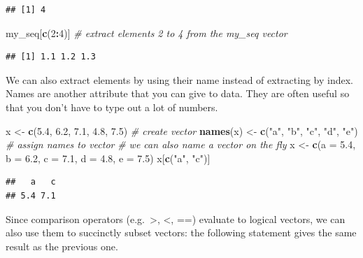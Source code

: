\documentclass[
]{book}
\newenvironment{Shaded}{\begin{snugshade}}{\end{snugshade}}
\newcommand{\AttributeTok}[1]{\textcolor[rgb]{0.13,0.29,0.53}{#1}}
\newcommand{\CommentTok}[1]{\textcolor[rgb]{0.56,0.35,0.01}{\textit{#1}}}
\newcommand{\DecValTok}[1]{\textcolor[rgb]{0.00,0.00,0.81}{#1}}
\newcommand{\FloatTok}[1]{\textcolor[rgb]{0.00,0.00,0.81}{#1}}
\newcommand{\FunctionTok}[1]{\textcolor[rgb]{0.13,0.29,0.53}{\textbf{#1}}}
\newcommand{\NormalTok}[1]{#1}
\newcommand{\OtherTok}[1]{\textcolor[rgb]{0.56,0.35,0.01}{#1}}
\newcommand{\SpecialCharTok}[1]{\textcolor[rgb]{0.81,0.36,0.00}{\textbf{#1}}}
\newcommand{\StringTok}[1]{\textcolor[rgb]{0.31,0.60,0.02}{#1}}
\begin{document}
\begin{verbatim}
## [1] 4
\end{verbatim}

\begin{Shaded}
\begin{Highlighting}[]
\NormalTok{my\_seq[}\FunctionTok{c}\NormalTok{(}\DecValTok{2}\SpecialCharTok{:}\DecValTok{4}\NormalTok{)] }\CommentTok{\# extract elements 2 to 4 from the my\_seq vector}
\end{Highlighting}
\end{Shaded}

\begin{verbatim}
## [1] 1.1 1.2 1.3
\end{verbatim}

We can also extract elements by using their name instead of extracting by index. Names are another attribute that you can give to data. They are often useful so that you don't have to type out a lot of numbers.

\begin{Shaded}
\begin{Highlighting}[]
\NormalTok{x }\OtherTok{\textless{}{-}} \FunctionTok{c}\NormalTok{(}\FloatTok{5.4}\NormalTok{, }\FloatTok{6.2}\NormalTok{, }\FloatTok{7.1}\NormalTok{, }\FloatTok{4.8}\NormalTok{, }\FloatTok{7.5}\NormalTok{) }\CommentTok{\# create vector}
\FunctionTok{names}\NormalTok{(x) }\OtherTok{\textless{}{-}} \FunctionTok{c}\NormalTok{(}\StringTok{"a"}\NormalTok{, }\StringTok{"b"}\NormalTok{, }\StringTok{"c"}\NormalTok{, }\StringTok{"d"}\NormalTok{, }\StringTok{"e"}\NormalTok{) }\CommentTok{\# assign names to vector}
\CommentTok{\# we can also name a vector \textquotesingle{}on the fly\textquotesingle{}}
\NormalTok{x }\OtherTok{\textless{}{-}} \FunctionTok{c}\NormalTok{(}\AttributeTok{a =} \FloatTok{5.4}\NormalTok{, }\AttributeTok{b =} \FloatTok{6.2}\NormalTok{, }\AttributeTok{c =} \FloatTok{7.1}\NormalTok{, }\AttributeTok{d =} \FloatTok{4.8}\NormalTok{, }\AttributeTok{e =} \FloatTok{7.5}\NormalTok{) }
\NormalTok{x[}\FunctionTok{c}\NormalTok{(}\StringTok{"a"}\NormalTok{, }\StringTok{"c"}\NormalTok{)]}
\end{Highlighting}
\end{Shaded}

\begin{verbatim}
##   a   c 
## 5.4 7.1
\end{verbatim}

Since comparison operators (e.g.~\textgreater, \textless, ==) evaluate to logical vectors, we can also use them to succinctly subset vectors: the following statement gives the same result as the previous one.
\end{document}
